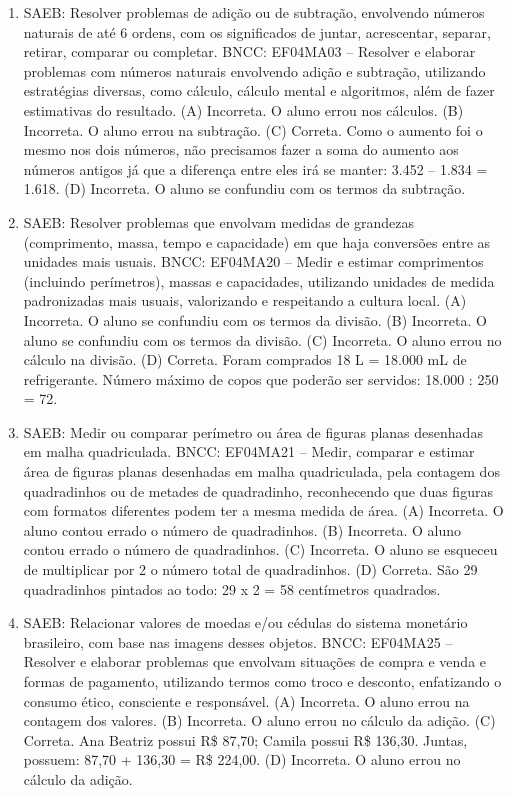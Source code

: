 \begin{enumerate}
\item
SAEB: Resolver problemas de adição ou de subtração, envolvendo números
naturais de até 6 ordens, com os significados de juntar, acrescentar,
separar, retirar, comparar ou completar.
BNCC: EF04MA03 -- Resolver e elaborar problemas com números naturais envolvendo adição e subtração,
utilizando estratégias diversas, como cálculo, cálculo mental e algoritmos, além de fazer estimativas
do resultado.
(A) Incorreta. O aluno errou nos cálculos.
(B) Incorreta. O aluno errou na subtração.
(C) Correta. Como o aumento foi o mesmo nos dois números, não
precisamos fazer a soma do aumento aos números antigos já que a
diferença entre eles irá se manter: 3.452 -- 1.834 = 1.618.
(D) Incorreta. O aluno se confundiu com os termos da subtração.

\item
SAEB: Resolver problemas que envolvam medidas de grandezas
(comprimento, massa, tempo e capacidade) em que haja conversões entre as
unidades mais usuais.
BNCC: EF04MA20 -- Medir e estimar comprimentos (incluindo perímetros), massas e capacidades, utilizando
unidades de medida padronizadas mais usuais, valorizando e respeitando a cultura local.
(A) Incorreta. O aluno se confundiu com os termos da divisão.
(B) Incorreta. O aluno se confundiu com os termos da divisão.
(C) Incorreta. O aluno errou no cálculo na divisão.
(D) Correta. Foram comprados 18 L = 18.000 mL de refrigerante.
Número máximo de copos que poderão ser servidos: 18.000 : 250 = 72.

\item
SAEB: Medir ou comparar perímetro ou área de figuras planas
desenhadas em malha quadriculada.
BNCC: EF04MA21 -- Medir, comparar e estimar área de figuras planas desenhadas em malha quadriculada,
pela contagem dos quadradinhos ou de metades de quadradinho, reconhecendo que duas figuras
com formatos diferentes podem ter a mesma medida de área.
(A) Incorreta. O aluno contou errado o número de quadradinhos.
(B) Incorreta. O aluno contou errado o número de quadradinhos.
(C) Incorreta. O aluno se esqueceu de multiplicar por 2 o número total de quadradinhos.
(D) Correta. São 29 quadradinhos pintados ao todo: 29 x 2 = 58 centímetros quadrados.

\item
SAEB: Relacionar valores de moedas e/ou cédulas do sistema
monetário brasileiro, com base nas imagens desses objetos.
BNCC: EF04MA25 -- Resolver e elaborar problemas que envolvam situações de compra e venda e formas
de pagamento, utilizando termos como troco e desconto, enfatizando o consumo ético, consciente e
responsável.
(A) Incorreta. O aluno errou na contagem dos valores.
(B) Incorreta. O aluno errou no cálculo da adição.
(C) Correta. Ana Beatriz possui R\$ 87,70; Camila possui R\$ 136,30. Juntas, possuem: 87,70 + 136,30 = R\$ 224,00.
(D) Incorreta. O aluno errou no cálculo da adição.


\end{enumerate}
